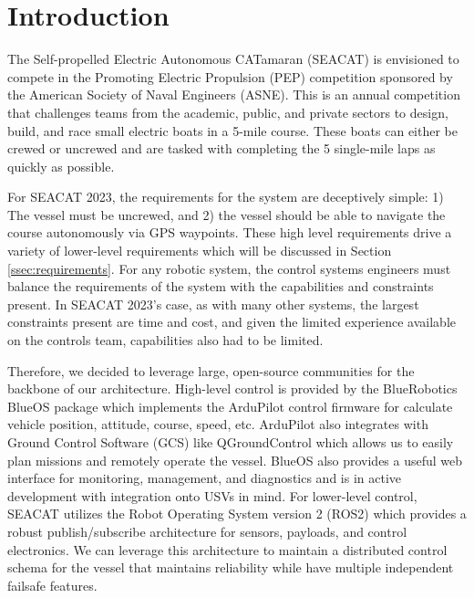 %

\chapter{Introduction}
\setchapterpreamble[u]{\margintoc}

The Self-propelled Electric Autonomous CATamaran (SEACAT) is envisioned to compete in the Promoting Electric Propulsion (PEP) competition sponsored by the American Society of Naval Engineers (ASNE).
This is an annual competition that challenges teams from the academic, public, and private sectors to design, build, and race small electric boats in a 5-mile course.
These boats can either be crewed or uncrewed and are tasked with completing the 5 single-mile laps as quickly as possible.

For SEACAT 2023, the requirements for the system are deceptively simple: 1) The vessel must be uncrewed, and 2) the vessel should be able to navigate the course autonomously via GPS waypoints.
These high level requirements drive a variety of lower-level requirements which will be discussed in Section \ref{ssec:requirements}.
For any robotic system, the control systems engineers must balance the requirements of the system with the capabilities and constraints present.
In SEACAT 2023's case, as with many other systems, the largest constraints present are time and cost, and given the limited experience available on the controls team, capabilities also had to be limited.

Therefore, we decided to leverage large, open-source communities for the backbone of our architecture.
High-level control is provided by the BlueRobotics BlueOS package which implements the ArduPilot control firmware for calculate vehicle position, attitude, course, speed, etc.
ArduPilot also integrates with Ground Control Software (GCS) like QGroundControl which allows us to easily plan missions and remotely operate the vessel.
BlueOS also provides a useful web interface for monitoring, management, and diagnostics and is in active development with integration onto USVs in mind.
For lower-level control, SEACAT utilizes the Robot Operating System version 2 (ROS2) which provides a robust publish/subscribe architecture for sensors, payloads, and control electronics.
We can leverage this architecture to maintain a distributed control schema for the vessel that maintains reliability while have multiple independent failsafe features.

